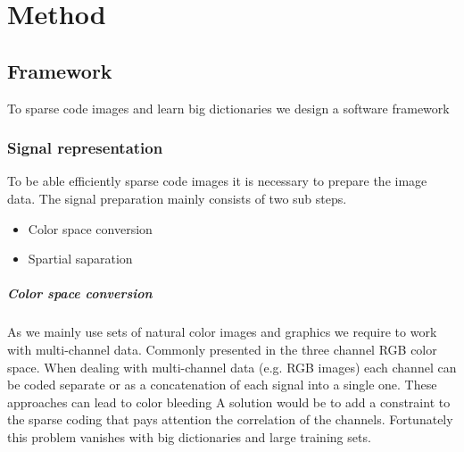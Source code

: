 \chapter{Method}

\section{Framework}
To sparse code images and learn big dictionaries we design a software framework

\subsection{Signal representation}
\label{sec:signal_representation}
To be able efficiently sparse code images it is necessary to prepare the
image data. The signal preparation mainly consists of two sub steps.
\begin{itemize}
 \item Color space conversion
 \item Spartial saparation
\end{itemize}

\paragraph{Color space conversion} As we mainly use sets of natural color images
and graphics we require to work with multi-channel data. Commonly presented in
the three channel RGB color space.
When dealing with multi-channel data (e.g. RGB images) each channel can be coded
separate or as a concatenation of each signal into a single one. These
approaches can lead to color bleeding \cite{mairal08sparse} 
A solution would be to add a constraint to the sparse coding that pays attention
the correlation of the channels.  
Fortunately this problem vanishes with big dictionaries and large training sets.
\cite{mairal08sparse}

